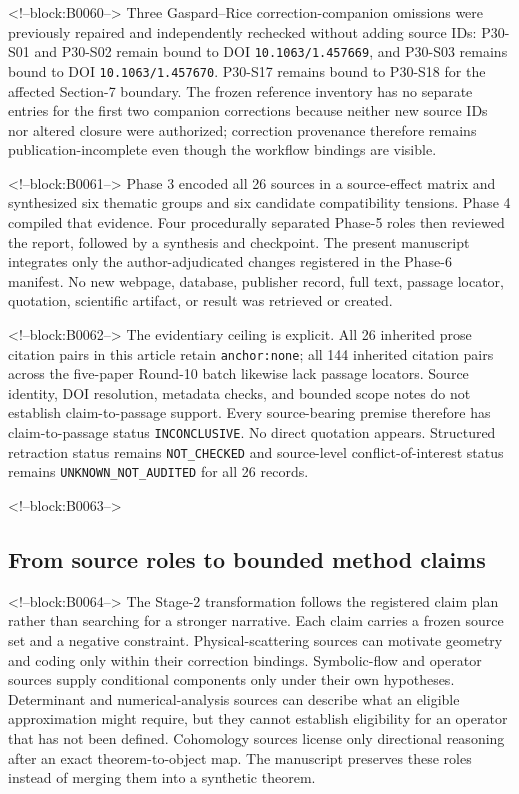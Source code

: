 \documentclass[11pt,a4paper]{article}
\begin{document}
<!--block:B0060-->
Three Gaspard--Rice correction-companion omissions were previously repaired and independently rechecked without adding source IDs: P30-S01 and P30-S02 remain bound to DOI \texttt{10.1063/1.457669}, and P30-S03 remains bound to DOI \texttt{10.1063/1.457670}. P30-S17 remains bound to P30-S18 for the affected Section-7 boundary. The frozen reference inventory has no separate entries for the first two companion corrections because neither new source IDs nor altered closure were authorized; correction provenance therefore remains publication-incomplete even though the workflow bindings are visible.

<!--block:B0061-->
Phase 3 encoded all 26 sources in a source-effect matrix and synthesized six thematic groups and six candidate compatibility tensions. Phase 4 compiled that evidence. Four procedurally separated Phase-5 roles then reviewed the report, followed by a synthesis and checkpoint. The present manuscript integrates only the author-adjudicated changes registered in the Phase-6 manifest. No new webpage, database, publisher record, full text, passage locator, quotation, scientific artifact, or result was retrieved or created.

<!--block:B0062-->
The evidentiary ceiling is explicit. All 26 inherited prose citation pairs in this article retain \texttt{anchor:\allowbreak none}; all 144 inherited citation pairs across the five-paper Round-10 batch likewise lack passage locators. Source identity, DOI resolution, metadata checks, and bounded scope notes do not establish claim-to-passage support. Every source-bearing premise therefore has claim-to-passage status \texttt{INCONCLUSIVE}. No direct quotation appears. Structured retraction status remains \texttt{NOT\_CHECKED} and source-level conflict-of-interest status remains \texttt{UNKNOWN\_NOT\_AUDITED} for all 26 records.

<!--block:B0063-->
\subsection{From source roles to bounded method claims}

<!--block:B0064-->
The Stage-2 transformation follows the registered claim plan rather than searching for a stronger narrative. Each claim carries a frozen source set and a negative constraint. Physical-scattering sources can motivate geometry and coding only within their correction bindings. Symbolic-flow and operator sources supply conditional components only under their own hypotheses. Determinant and numerical-analysis sources can describe what an eligible approximation might require, but they cannot establish eligibility for an operator that has not been defined. Cohomology sources license only directional reasoning after an exact theorem-to-object map. The manuscript preserves these roles instead of merging them into a synthetic theorem.
\end{document}
